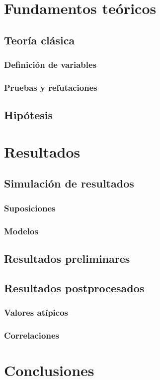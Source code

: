 \documentclass[12pt]{book}
\begin{document}
\chapter{Fundamentos teóricos}
\section{Teoría clásica}
\subsection{Definición de variables}
\subsection{Pruebas y refutaciones}
\section{Hipótesis}
\chapter{Resultados}
\section{Simulación de resultados}
\subsection{Suposiciones}
\subsection{Modelos}
\section{Resultados preliminares}
\section{Resultados postprocesados}
\subsection{Valores atípicos}
\subsection{Correlaciones}
\chapter{Conclusiones}
\end{document}
